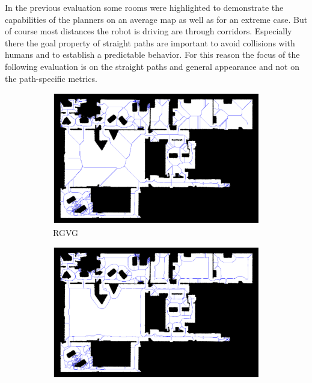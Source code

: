 In the previous evaluation some rooms were highlighted to demonstrate the capabilities of the planners on an average map as well as for an extreme case. But of course most distances the robot is driving are through corridors. Especially there the goal property of straight paths are important to avoid collisions with humans and to establish a predictable behavior. For this reason the focus of the following evaluation is on the straight paths and general appearance and not on the path-specific metrics. 

\begin{figure}[h]
    \captionsetup[subfigure]{justification=centering}
    \centering
    \begin{subfigure}{.5\textwidth}
      \centering
      \includegraphics[width=\textwidth]{figures/60_results/hou2_roadmap_RGVG.png}
      \caption{RGVG}
    \end{subfigure}%
    \begin{subfigure}{.5\textwidth}
      \centering
      \includegraphics[width=\textwidth]{figures/60_results/hou2_roadmap_evg.png}

\end{subfigure}
\end{figure}
